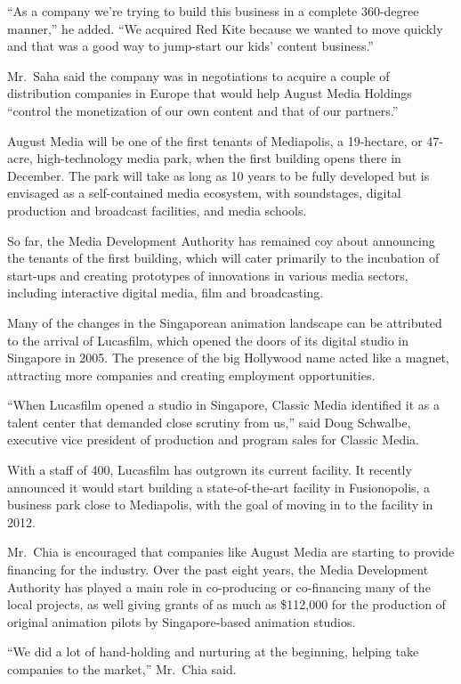 ﻿\documentclass[12pt]{article}
\begin{document}
``As a company we're trying to build this business in a complete 360-degree manner,'' he added. ``We
acquired Red Kite because we wanted to move quickly and that was a good way to jump-start our kids'
content business.''

Mr.~Saha said the company was in negotiations to acquire a couple of distribution companies in
Europe that would help August Media Holdings ``control the monetization of our own content and that
of our partners.''

August Media will be one of the first tenants of Mediapolis, a 19-hectare, or 47-acre,
high-technology media park, when the first building opens there in December. The park will take as
long as 10 years to be fully developed but is envisaged as a self-contained media ecosystem, with
soundstages, digital production and broadcast facilities, and media schools.

So far, the Media Development Authority has remained coy about announcing the tenants of the first
building, which will cater primarily to the incubation of start-ups and creating prototypes of
innovations in various media sectors, including interactive digital media, film and broadcasting.

Many of the changes in the Singaporean animation landscape can be attributed to the arrival of
Lucasfilm, which opened the doors of its digital studio in Singapore in 2005. The presence of the
big Hollywood name acted like a magnet, attracting more companies and creating employment
opportunities.

``When Lucasfilm opened a studio in Singapore, Classic Media identified it as a talent center that
demanded close scrutiny from us,'' said Doug Schwalbe, executive vice president of production and
program sales for Classic Media.

With a staff of 400, Lucasfilm has outgrown its current facility. It recently announced it would
start building a state-of-the-art facility in Fusionopolis, a business park close to Mediapolis,
with the goal of moving in to the facility in 2012.

Mr.~Chia is encouraged that companies like August Media are starting to provide financing for the
industry. Over the past eight years, the Media Development Authority has played a main role in
co-producing or co-financing many of the local projects, as well giving grants of as much as
\$112,000 for the production of original animation pilots by Singapore-based animation studios.

``We did a lot of hand-holding and nurturing at the beginning, helping take companies to the
market,'' Mr.~Chia said.
\end{document}
